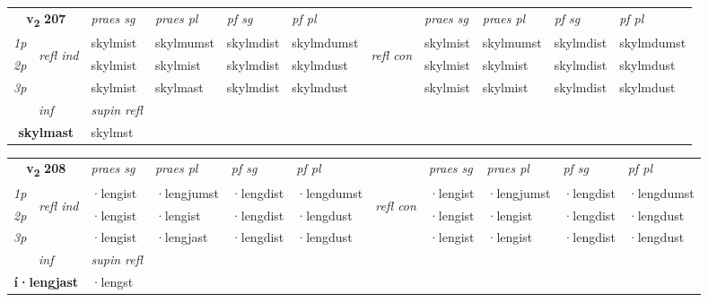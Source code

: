 \noindent
\begin{tabular}{lllllllllll} \toprule
\multicolumn{2}{c}{\textbf{v{\textsubscript{2}}} \Large{\textbf{207}}}  &  \textit{praes sg}  & \textit{praes pl}  &\textit{ pf sg} & \textit{pf pl} &  &  \textit{praes sg}  & \textit{praes pl}  & \textit{pf sg} & \textit{pf pl } \\*
	\cmidrule{3-6} \cmidrule{8-11}
 {\textit{1p}} & \multirow{3}{*}{\begin{turn}{90}\textit{refl ind}\end{turn}}  & skylmist & skylmumst & skylmdist & skylmdumst & \multirow{3}{*}{\begin{turn}{90}\textit{refl con}\end{turn}}  &skylmist & skylmumst & skylmdist & skylmdumst \\*
 {\textit{2p}} &  & skylmist & skylmist & skylmdist & skylmdust & &skylmist & skylmist & skylmdist & skylmdust \\*
 {\textit{3p}}  & & skylmist & skylmast & skylmdist & skylmdust & & skylmist & skylmist& skylmdist & skylmdust \\*
\cmidrule{3-6} \cmidrule{8-11}

   \multicolumn{2}{c}{\textit{inf}}       & \textit{supin refl}  \\*
  \multicolumn{2}{c}{\textbf{skylmast}}        & skylmst  \\*
\end{tabular}

\noindent
\begin{tabular}{lllllllllll} \toprule
\multicolumn{2}{c}{\textbf{v{\textsubscript{2}}} \Large{\textbf{208}}}  &  \textit{praes sg}  & \textit{praes pl}  &\textit{ pf sg} & \textit{pf pl} &  &  \textit{praes sg}  & \textit{praes pl}  & \textit{pf sg} & \textit{pf pl } \\*
	\cmidrule{3-6} \cmidrule{8-11}
 {\textit{1p}} & \multirow{3}{*}{\begin{turn}{90}\textit{refl ind}\end{turn}}  & ·lengist & ·lengjumst & ·lengdist & ·lengdumst & \multirow{3}{*}{\begin{turn}{90}\textit{refl con}\end{turn}}  &·lengist & ·lengjumst & ·lengdist & ·lengdumst \\*
 {\textit{2p}} &  & ·lengist & ·lengist & ·lengdist & ·lengdust & &·lengist & ·lengist & ·lengdist & ·lengdust \\*
 {\textit{3p}}  & & ·lengist & ·lengjast & ·lengdist & ·lengdust & & ·lengist & ·lengist& ·lengdist & ·lengdust \\*
\cmidrule{3-6} \cmidrule{8-11}

   \multicolumn{2}{c}{\textit{inf}}       & \textit{supin refl}  \\*
  \multicolumn{2}{c}{\textbf{í\allowbreak ·lengjast}}        & ·lengst  \\*
\end{tabular}

